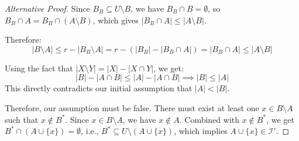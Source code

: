 \documentclass[12pt,a4paper]{article}
\theoremstyle{definition}
\begin{document}
\begin{proof}[Alternative Proof]
        Since $B_B \subseteq U \setminus B$, we have $B_B \cap B = \emptyset$, so $B_B \cap A = B_B \cap (A \setminus B)$, which gives $|B_B \cap A| \leq |A \setminus B|$.

        Therefore:
        $$|B \setminus A| \leq r - |B_B \setminus A| = r - (|B_B| - |B_B \cap A|) = |B_B \cap A| \leq |A \setminus B|$$

        Using the fact that $|X \setminus Y| = |X| - |X \cap Y|$, we get:
        $$|B| - |A \cap B| \leq |A| - |A \cap B| \implies |B| \leq |A|$$
        This directly contradicts our initial assumption that $|A| < |B|$.

        Therefore, our assumption must be false. There must exist at least one $x \in B \setminus A$ such that $x \notin B^*$. Since $x \in B \setminus A$, we have $x \notin A$. Combined with $x \notin B^*$, we get $B^* \cap (A \cup \{x\}) = \emptyset$, i.e., $B^* \subseteq U \setminus (A \cup \{x\})$, which implies $A \cup \{x\} \in \mathcal{I}'$.
        
        \end{proof}


\end{document}
